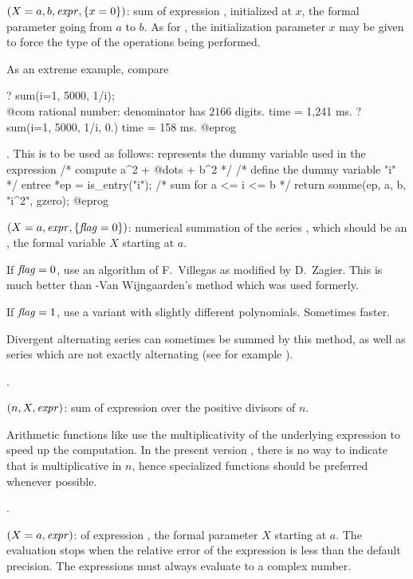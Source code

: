 
$(X=a,b,\hbox{\it expr\/},\{x=0\})$: sum of expression ,
initialized at $x$, the formal parameter going from $a$ to $b$. As for
, the initialization parameter $x$ may be given to force the type
of the operations being performed.

\noindent As an extreme example, compare

\bprog
? sum(i=1, 5000, 1/i); \\@com rational number: denominator has $2166$ digits.
time = 1,241 ms.
? sum(i=1, 5000, 1/i, 0.)
time = 158 ms.
@eprog

. This is to be
used as follows:  represents the dummy variable used in the
expression 
\bprog
/* compute a^2 + @dots + b^2 */
{
  /* define the dummy variable "i" */
  entree *ep = is_entry("i");
  /* sum for a <= i <= b */
  return somme(ep, a, b, "i^2", gzero);
}
@eprog

$(X=a,\hbox{\it expr\/},\{\hbox{\it f\kern0pt lag\/}=0\})$: numerical summation of the
series , which should be an , the formal
variable $X$ starting at $a$.

If $\hbox{\it f\kern0pt lag\/}=0$, use an algorithm of F.~Villegas as modified by D.~Zagier. This
is much better than -Van Wijngaarden's method which was used
formerly.

If $\hbox{\it f\kern0pt lag\/}=1$, use a variant with slightly different polynomials. Sometimes
faster.

Divergent alternating series can sometimes be summed by this method, as well
as series which are not exactly alternating (see for example
).

.

$(n,X,\hbox{\it expr\/})$: sum of expression  over
the positive divisors of $n$.

Arithmetic functions like  use the multiplicativity of the
underlying expression to speed up the computation. In the present version
\vers, there is no way to indicate that  is multiplicative in
$n$, hence specialized functions should be preferred whenever possible.

.

$(X=a,\hbox{\it expr\/})$:  of expression
, the formal parameter $X$ starting at $a$. The evaluation stops
when the relative error of the expression is less than the default precision.
The expressions must always evaluate to a complex number.

